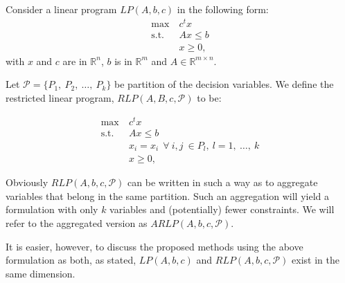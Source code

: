 \documentclass[runningheads]{llncs}
\newcommand{\cP}{{\mathcal P}}
\begin{document}




Consider a linear program $LP(A,b,c)$ in the following form:
\begin{align} \label{eq:LP}
  \max \ & c^t x \\
  \mbox{s.t. } & Ax \leq b\\
  & x \geq 0,
  \end{align}
\noindent with  $x$ and  $c$ are in $\mathbb{R}^n$, $b$ is in $\mathbb{R}^m$ and
$A \in \mathbb{R}^{m \times n}$.

Let $\cP = \{P_1,\ P_2,\ \ldots,\ P_k\}$ be partition of the decision variables. We define the restricted
linear program, $RLP(A,B,c,\cP)$ to be:

\begin{align}
  \max \ & c^t x \\
  \mbox{s.t. } & Ax \leq b \label{cons:orig}\\
  & x_i = x_i \ \ \forall\ i,j \ \in P_l,\  l= 1,\ \ldots,\ k \label{cons:equal}\\
  & x \geq 0,
  \end{align}

\noindent Obviously $RLP(A,b,c,\cP)$ can be written in such a way as to aggregate variables that
belong in the same partition. Such an aggregation will yield a formulation with
only $k$ variables and (potentially) fewer constraints. We will refer to the aggregated version as $ARLP(A,b,c,\cP)$.

 It is easier, however, to
discuss the proposed methods using the above formulation as both, as stated,  $LP(A,b,c)$ and
$RLP(A,b,c,\cP)$ exist in the same dimension.
\end{document}
